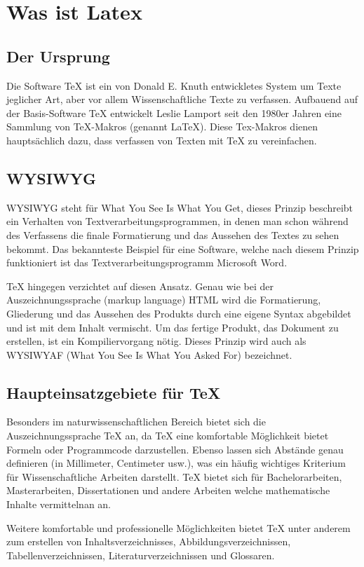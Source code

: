 \chapter{Was ist Latex}
 \section{Der Ursprung}
 Die Software TeX ist ein von Donald E. Knuth entwickletes System um Texte jeglicher Art, aber vor allem Wissenschaftliche Texte zu verfassen. Aufbauend auf der Basis-Software TeX entwickelt Leslie Lamport seit den 1980er Jahren eine Sammlung von TeX-Makros (genannt LaTeX). Diese Tex-Makros dienen hauptsächlich dazu, dass verfassen von Texten mit TeX zu vereinfachen.

 \section{WYSIWYG}
 WYSIWYG steht für What You See Is What You Get, dieses Prinzip beschreibt ein Verhalten von Textverarbeitungsprogrammen, in denen man schon während des Verfassens die finale Formatierung und das Aussehen des Textes zu sehen bekommt. Das bekannteste Beispiel für eine Software, welche nach diesem Prinzip funktioniert ist das Textverarbeitungsprogramm Microsoft Word.

 TeX hingegen verzichtet auf diesen Ansatz. Genau wie bei der Auszeichnungssprache (markup language) HTML wird die Formatierung, Gliederung und das Aussehen des Produkts durch eine eigene Syntax abgebildet und ist mit dem Inhalt vermischt. Um das fertige Produkt, das Dokument zu erstellen, ist ein Kompiliervorgang nötig. Dieses Prinzip wird auch als WYSIWYAF (What You See Is What You Asked For) bezeichnet.

 \section{Haupteinsatzgebiete für TeX}
 Besonders im naturwissenschaftlichen Bereich bietet sich die Auszeichnungssprache TeX an, da TeX eine komfortable Möglichkeit bietet Formeln oder Programmcode darzustellen. Ebenso lassen sich Abstände genau definieren (in Millimeter, Centimeter usw.), was ein häufig wichtiges Kriterium für Wissenschaftliche Arbeiten darstellt. TeX bietet sich für Bachelorarbeiten, Masterarbeiten, Dissertationen und andere Arbeiten welche mathematische Inhalte vermittelnan an.

 Weitere komfortable und professionelle Möglichkeiten bietet TeX unter anderem zum erstellen von Inhaltsverzeichnisses, Abbildungsverzeichnissen, Tabellenverzeichnissen, Literaturverzeichnissen und Glossaren.


